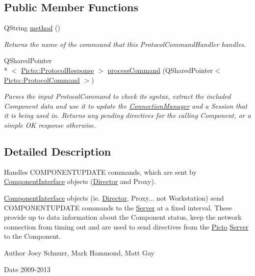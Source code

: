 \subsection*{Public Member Functions}
\begin{DoxyCompactItemize}
\item 
\hypertarget{struct_component_update_command_handler_ac59be42f66877d0fa80bd374bd6f9b3a}{Q\-String \hyperlink{struct_component_update_command_handler_ac59be42f66877d0fa80bd374bd6f9b3a}{method} ()}\label{struct_component_update_command_handler_ac59be42f66877d0fa80bd374bd6f9b3a}

\begin{DoxyCompactList}\small\item\em Returns the name of the commeand that this Protocol\-Command\-Handler handles. \end{DoxyCompactList}\item 
Q\-Shared\-Pointer\\*
$<$ \hyperlink{struct_picto_1_1_protocol_response}{Picto\-::\-Protocol\-Response} $>$ \hyperlink{struct_component_update_command_handler_aaa24cab0df08301bfdf7434c3a273ccb}{process\-Command} (Q\-Shared\-Pointer$<$ \hyperlink{struct_picto_1_1_protocol_command}{Picto\-::\-Protocol\-Command} $>$)
\begin{DoxyCompactList}\small\item\em Parses the input Protocol\-Command to check its syntax, extract the included Component data and use it to update the \hyperlink{class_connection_manager}{Connection\-Manager} and a Session that it is being used in. Returns any pending directives for the calling Component, or a simple O\-K response otherwise. \end{DoxyCompactList}\end{DoxyCompactItemize}


\subsection{Detailed Description}
Handles C\-O\-M\-P\-O\-N\-E\-N\-T\-U\-P\-D\-A\-T\-E commands, which are sent by \hyperlink{class_component_interface}{Component\-Interface} objects (\hyperlink{class_director}{Director} and Proxy). 

\hyperlink{class_component_interface}{Component\-Interface} objects (ie. \hyperlink{class_director}{Director}, Proxy... not Workstation) send C\-O\-M\-P\-O\-N\-E\-N\-T\-U\-P\-D\-A\-T\-E commands to the \hyperlink{class_server}{Server} at a fixed interval. These provide up to data information about the Component status, keep the network connection from timing out and are used to send directives from the \hyperlink{namespace_picto}{Picto} \hyperlink{class_server}{Server} to the Component. \begin{DoxyAuthor}{Author}
Joey Schnurr, Mark Hammond, Matt Gay 
\end{DoxyAuthor}
\begin{DoxyDate}{Date}
2009-\/2013 
\end{DoxyDate}



